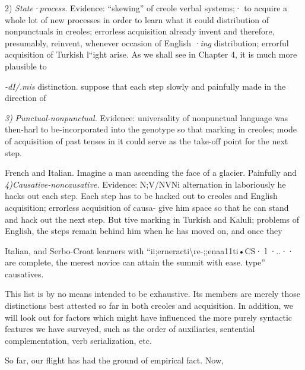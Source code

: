 2) \textit{State}\textit{·}\textit{process.} Evidence: ``skewing'' of creole verbal systems;· to acquire a whole lot of new processes in order to learn what it could distribution of nonpunctuals in creoles; errorless acquisition already invent and therefore, presumably, reinvent, whenever occasion of English \textit{·}\textit{ing }distribution; errorful acquisition of Turkish l``ight arise. As we shall see in Chapter 4, it is much more plausible to

\textit{-dI/.mis} distinction. suppose that each step slowly and painfully made in the direction of

\textit{3}\textit{)} \textit{Punctual-nonpunctual.} Evidence: universality of nonpunctual language was then-harl to be-incorporated into the genotype so that marking in creoles; mode of acquisition of past tenses in it could serve as the take-off point for the next step.

French and Italian. Imagine a man ascending the face of a glacier. Painfully and \textit{4)Causative-noncausative. }Evidence: N;V/NVNi alternation in laboriously he hacks out each step. Each step has to be hacked out to creoles and English acquisition; errorless acquisition of causa- give him space so that he can stand and hack out the next step. But tive marking in Turkish and Kaluli; problems of English, the steps remain behind him when he has moved on, and once they

Italian, and Serbo-Croat learners with ``ii;erneracti{\textbackslash}re-;;enaa11ti•CS· l ·..·· are complete, the merest novice can attain the summit with ease. type'' causatives.

This list is by no means intended to be exhaustive. Its members are merely those distinctions best attested so far in both creoles and acquisition. In addition, we will look out for factors which might have influenced the more purely syntactic features we have surveyed, such as the order of auxiliaries, sentential complementation, verb serialization, etc.

So far, our flight has had the ground of empirical fact. Now,
